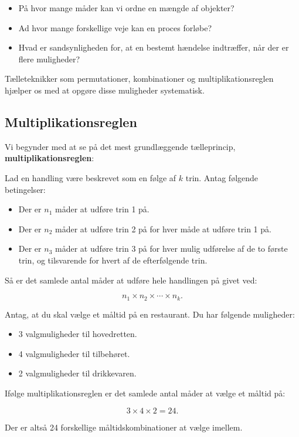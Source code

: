 \begin{itemize}
    \item På hvor mange måder kan vi ordne en mængde af objekter?
    \item Ad hvor mange forskellige veje kan en proces forløbe?
    \item Hvad er sandsynligheden for, at en bestemt hændelse indtræffer, når der er flere muligheder?
\end{itemize}

Tælleteknikker som permutationer, kombinationer og multiplikationsreglen hjælper os med at opgøre disse muligheder systematisk.

\subsection*{Multiplikationsreglen}

Vi begynder med at se på det mest grundlæggende tælleprincip, \textbf{multiplikationsreglen}:

\begin{theorem}[Multiplikationsreglen]
    Lad en handling være beskrevet som en følge af $k$ trin. Antag følgende betingelser:
    
    \begin{itemize}
        \item Der er $n_1$ måder at udføre trin 1 på.
        \item Der er $n_2$ måder at udføre trin 2 på for hver måde at udføre trin 1 på.
        \item Der er $n_3$ måder at udføre trin 3 på for hver mulig udførelse af de to første trin, og tilsvarende for hvert af de efterfølgende trin.
    \end{itemize}
    
    Så er det samlede antal måder at udføre hele handlingen på givet ved:
    
    \[
    n_1 \times n_2 \times \cdots \times n_k.
    \]
\end{theorem}
    
\begin{example}
    Antag, at du skal vælge et måltid på en restaurant. Du har følgende muligheder:
        
    \begin{itemize}
            \item 3 valgmuligheder til hovedretten.
            \item 4 valgmuligheder til tilbehøret.
            \item 2 valgmuligheder til drikkevaren.
    \end{itemize}
        
    Ifølge multiplikationsreglen er det samlede antal måder at vælge et måltid på:
        
    \[
        3 \times 4 \times 2 = 24.
    \]
        
    Der er altså 24 forskellige måltidskombinationer at vælge imellem.
\end{example}

